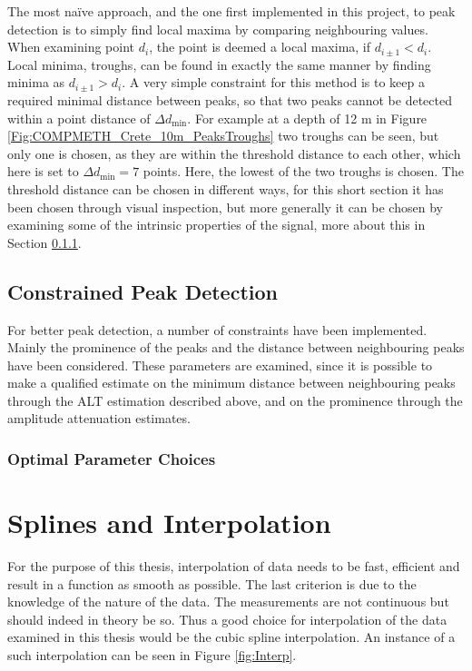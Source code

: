 \documentclass[../../CompleteThesis2/Complete_2ndDraft]{subfiles}
\begin{document}
The most naïve approach, and the one first implemented in this project, to peak detection is to simply find local maxima by comparing neighbouring values. When examining point $d_i$, the point is deemed a local maxima, if $d_{i\pm1} < d_i$. Local minima, troughs, can be found in exactly the same manner by finding minima as $d_{i\pm1} > d_i$. A very simple constraint for this method is to keep a required minimal distance between peaks, so that two peaks cannot be detected within a point distance of $\Delta d_{\text{min}}$. For example at a depth of 12 m in Figure \ref{Fig:COMPMETH_Crete_10m_PeaksTroughs} two troughs can be seen, but only one is chosen, as they are within the threshold distance to each other, which here is set to $\Delta d_{\text{min}} = 7$ points. Here, the lowest of the two troughs is chosen. The threshold distance can be chosen in different ways, for this short section it has been chosen through visual inspection, but more generally it can be chosen by examining some of the intrinsic properties of the signal, more about this in Section \ref{}.


\subsection[Constrained Peak Detection]{Constrained Peak Detection}
\label{Subsec:CompMeths_PeakDetection_Constrained}
For better peak detection, a number of constraints have been implemented. Mainly the prominence of the peaks and the distance between neighbouring peaks have been considered. These parameters are examined, since it is possible to make a qualified estimate on the minimum distance between neighbouring peaks through the ALT estimation described above, and on the prominence through the amplitude attenuation estimates. 



\subsubsection[Optimal Choices]{Optimal Parameter Choices}




\section[Splines and Interpolation]{Splines and Interpolation}	
\label{Sec:CompMeths_SplinesAndInterpolation}
For the purpose of this thesis, interpolation of data needs to be fast, efficient and result in a function as smooth as possible. The last criterion is due to the knowledge of the nature of the data. The measurements are not continuous but should indeed in theory be so. Thus a good choice for interpolation of the data examined in this thesis would be the cubic spline interpolation. An instance of a such interpolation can be seen in Figure \ref{fig:Interp}.
\end{document}
